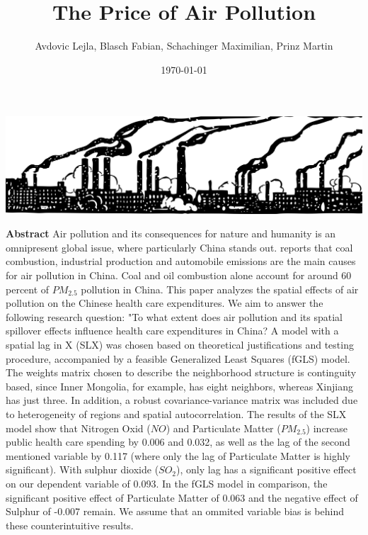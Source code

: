 \documentclass[
]{article}
\title{The Price of Air Pollution}
\author{Avdovic Lejla, Blasch Fabian, Schachinger Maximilian, Prinz Martin}
\date{\today}
\begin{document}
	\maketitle
	
	\begin{center}
		\includegraphics[width = 380pt]{pollution.png} 
	\end{center}
	\thispagestyle{empty}
	\vspace*{30pt}
		\textbf{Abstract}
	Air pollution and its consequences for nature and humanity is an omnipresent global issue, where particularly China stands out. \cite{rasch_under_nodate} reports that coal combustion, industrial production
	and automobile emissions are the main causes for
	air pollution in China. Coal and oil combustion alone account for around 60 percent of $PM_2.5$ pollution in China.
	This paper analyzes the spatial effects of air pollution on the Chinese health care expenditures. We aim to answer the following research question: "To what extent does air pollution and its spatial spillover effects influence health care expenditures in China? A model with a spatial lag in X (SLX) was chosen based on theoretical justifications and testing procedure, accompanied by a feasible Generalized Least Squares (fGLS) model. 
	The weights matrix chosen to describe the neighborhood structure is continguity based, since Inner Mongolia, for example, has eight neighbors, whereas Xinjiang has just three. 
	In addition, a robust covariance-variance matrix was included due to heterogeneity of regions and spatial autocorrelation. The results of the SLX model show that Nitrogen Oxid ($NO$) and Particulate Matter ($PM_{2.5}$)
	increase public health care spending by 0.006 and 0.032, as well as the lag of the second mentioned variable by 0.117 (where only the lag of Particulate Matter is highly significant). With sulphur dioxide ($SO_2$), only lag has a significant positive effect on our dependent variable of 0.093. In the fGLS model in comparison, the significant positive effect of Particulate Matter of 0.063 and the negative effect of Sulphur of -0.007 remain. We assume that an ommited variable bias is behind these counterintuitive results.
	\newpage
	
\end{document}
